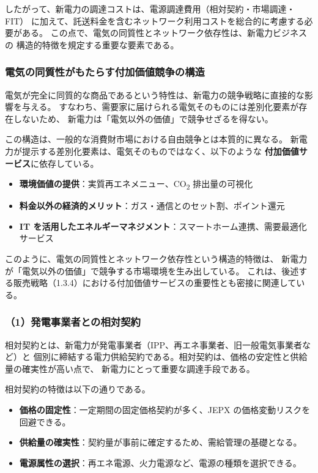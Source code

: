 したがって、新電力の調達コストは、電源調達費用（相対契約・市場調達・FIT）
に加えて、託送料金を含むネットワーク利用コストを総合的に考慮する必要がある。
この点で、電気の同質性とネットワーク依存性は、新電力ビジネスの
構造的特徴を規定する重要な要素である。

\subsubsection{電気の同質性がもたらす付加価値競争の構造}

電気が完全に同質的な商品であるという特性は、新電力の競争戦略に直接的な影響を与える。
すなわち、需要家に届けられる電気そのものには差別化要素が存在しないため、
新電力は「電気以外の価値」で競争せざるを得ない。

この構造は、一般的な消費財市場における自由競争とは本質的に異なる。
新電力が提示する差別化要素は、電気そのものではなく、以下のような
\textbf{付加価値サービス}に依存している。

\begin{itemize}
  \item \textbf{環境価値の提供}：実質再エネメニュー、CO\textsubscript{2} 排出量の可視化
  \item \textbf{料金以外の経済的メリット}：ガス・通信とのセット割、ポイント還元
  \item \textbf{IT を活用したエネルギーマネジメント}：スマートホーム連携、需要最適化サービス
\end{itemize}

このように、電気の同質性とネットワーク依存性という構造的特徴は、
新電力が「電気以外の価値」で競争する市場環境を生み出している。
これは、後述する販売戦略（1.3.4）における付加価値サービスの重要性とも密接に関連している。

\subsubsection{（1）発電事業者との相対契約}

相対契約とは、新電力が発電事業者（IPP、再エネ事業者、旧一般電気事業者など）と
個別に締結する電力供給契約である。相対契約は、価格の安定性と供給量の確実性が高い点で、
新電力にとって重要な調達手段である。

相対契約の特徴は以下の通りである。

\begin{itemize}
  \item \textbf{価格の固定性}：一定期間の固定価格契約が多く、JEPX の価格変動リスクを回避できる。
  \item \textbf{供給量の確実性}：契約量が事前に確定するため、需給管理の基礎となる。
  \item \textbf{電源属性の選択}：再エネ電源、火力電源など、電源の種類を選択できる。
\end{itemize}

